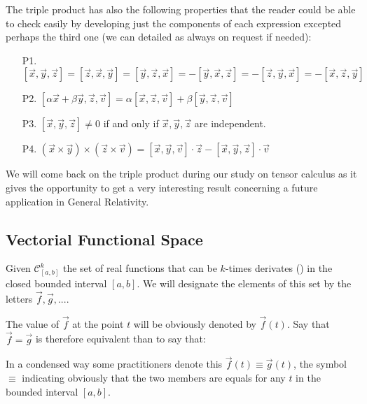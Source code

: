 	The triple product has also the following properties that the reader could be able to check easily by developing just the components of each expression excepted perhaps the third one (we can detailed as always on request if needed):
	\begin{enumerate}
		\item[P1.]  $[\vec{x},\vec{y},\vec{z}] =
	   [\vec{z},\vec{x},\vec{y}] =
	   [\vec{y},\vec{z},\vec{x}] =
	  -[\vec{y},\vec{x},\vec{z}] =
	  -[\vec{z},\vec{y},\vec{x}] =
	  -[\vec{x},\vec{z},\vec{y}]$
	  
	  \item[P2.] $[\alpha\vec{x}+\beta\vec{y},\vec{z},\vec{v}] =
	  \alpha[\vec{x},\vec{z},\vec{v}] +
	    \beta[\vec{y},\vec{z},\vec{v}]$
	    
	  \item[P3.] $[\vec{x},\vec{y},\vec{z}] \ne 0$ if and only if $\vec{x},\vec{y},\vec{z}$ are independent.
	  
	  \item[P4.] $(\vec{x}\times\vec{y})\times(\vec{z}\times\vec{v}) =
	  [\vec{x},\vec{y},\vec{v}] \cdot \vec{z} - [\vec{x},\vec{y},\vec{z}] \cdot \vec{v}$ 
	\end{enumerate}
	\begin{tcolorbox}[title=Remark,colframe=black,arc=10pt]
	We will come back on the triple product during our study on tensor calculus as it gives the opportunity to get a very interesting result concerning a future application in General Relativity.	
	\end{tcolorbox}
	
	
	\subsection{Vectorial Functional Space}
	Given $\mathcal{C}_{[a,b]}^k$ the set of real functions that can be $k$-times derivates () in the closed bounded interval $[a,b]$. We will designate the elements of this set by the letters $\vec{f},\vec{g},...$.
	
	The value of $\vec{f}$ at the point $t$ will be obviously denoted by $\vec{f}(t)$. Say that $\vec{f}=\vec{g}$ is therefore equivalent than to say that:
	 
	 In a condensed way some practitioners denote this $\vec{f}(t) \equiv \vec{g}(t)$, the symbol $\equiv$ indicating obviously that the two members are equals for any $t$ in the bounded interval $[a,b]$.
	 
